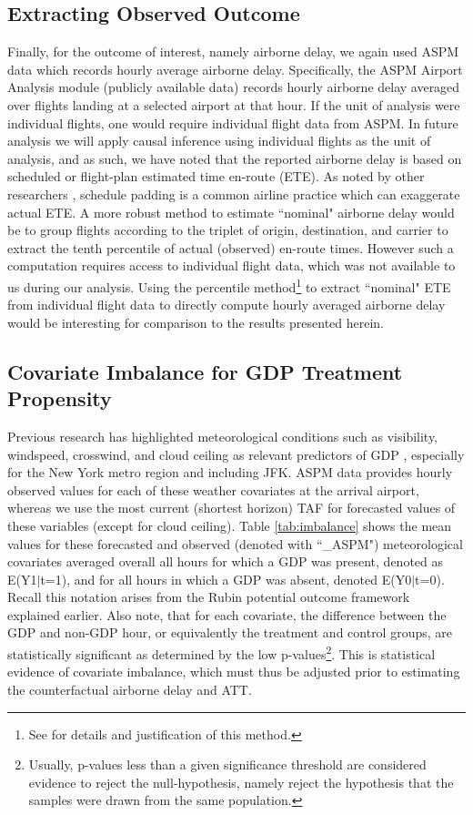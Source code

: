 \documentclass[conference]{IEEEtran}
\begin{document}
\subsection{Extracting Observed Outcome}
Finally, for the outcome of interest, namely airborne delay, we again used ASPM data which records hourly average airborne delay.  Specifically, the ASPM Airport Analysis module (publicly available data) records hourly airborne delay averaged over flights landing at a selected airport at that hour.  If the unit of analysis were individual flights, one would require individual flight data from ASPM.  In future analysis we will apply causal inference using individual flights as the unit of analysis, and as such, we have noted that the reported airborne delay is based on scheduled or flight-plan estimated time en-route (ETE).  As noted by other researchers \cite{hao2013airlines,skaltsas2011analysis}, schedule padding is a common airline practice which can exaggerate actual ETE.  A more robust method to estimate ``nominal" airborne delay would be to group flights according to the triplet of origin, destination, and carrier to extract the tenth percentile of actual (observed) en-route times.  However such a computation requires access to individual flight data, which was not available to us during our analysis.  Using the percentile method\footnote{See \cite{skaltsas2011analysis} for details and justification of this method.} to extract ``nominal" ETE from individual flight data to directly compute hourly averaged airborne delay would be interesting for comparison to the results presented herein.




\subsection{Covariate Imbalance for GDP Treatment Propensity}
Previous research has highlighted meteorological conditions such as visibility, windspeed, crosswind, and cloud ceiling as relevant predictors of GDP \cite{Grabbe:2014aa}, especially for the New York metro region and including JFK.  ASPM data provides hourly observed values for each of these weather covariates at the arrival airport, whereas we use the most current (shortest horizon) TAF for forecasted values of these variables (except for cloud ceiling).  Table \ref{tab:imbalance} shows the mean values for these forecasted and observed (denoted with ``\_ASPM") meteorological covariates averaged overall all hours for which a GDP was present, denoted as E(Y1$|$t=1), and for all hours in which a GDP was absent, denoted E(Y0$|$t=0).  Recall this notation arises from the Rubin potential outcome framework explained earlier.  Also note, that for each covariate, the difference between the GDP and non-GDP hour, or equivalently the treatment and control groups, are statistically significant as determined by the low p-values\footnote{Usually, p-values less than a given significance threshold are considered evidence to reject the null-hypothesis, namely reject the hypothesis that the samples were drawn from the same population.}.  This is statistical evidence of covariate imbalance, which must thus be adjusted prior to estimating the counterfactual airborne delay and ATT.
\end{document}
